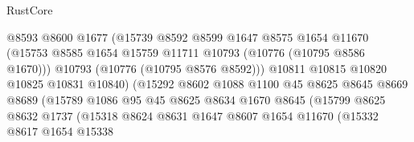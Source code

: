\begin{lexlean}{RustCore}
\begin{coremodule}
                                    @8593
                                    @8600
                                    @1677
                                    (@15739
                                      @8592
                                      @8599
                                      @1647
                                      @8575
                                      @1654
                                      @11670
                                      (@15753
                                        @8585
                                        @1654
                                        @15759
                                        @11711
                                        @10793
                                        (@10776 (@10795 @8586 @1670)))
                                      @10793
                                      (@10776 (@10795 @8576 @8592)))
                                    @10811
                                    @10815
                                    @10820
                                    @10825
                                    @10831
                                    @10840)
                                  (@15292
                                    @8602
                                    @1088
                                    @1100
                                    @45
                                    @8625
                                    @8645
                                    @8669
                                    @8689
                                    (@15789
                                      @1086
                                      @95
                                      @45
                                      @8625
                                      @8634
                                      @1670
                                      @8645
                                      (@15799
                                        @8625
                                        @8632
                                        @1737
                                        (@15318
                                          @8624
                                          @8631
                                          @1647
                                          @8607
                                          @1654
                                          @11670
                                          (@15332
                                            @8617
                                            @1654
                                            @15338

\end{coremodule}
\end{lexlean}
